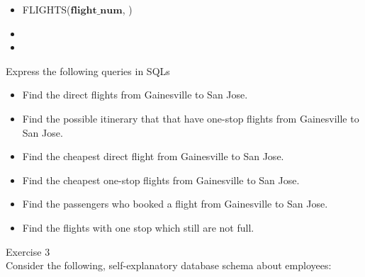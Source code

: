 \documentclass[12pt]{article}
\begin{document}
\begin{itemize}
\item 
FLIGHTS($\textbf{flight\_num}$, )
\item
{}
\item 
{}
\end{itemize}

Express the following queries in SQLs
\begin{itemize}
\item
Find the direct flights from Gainesville to San Jose.

\item 
Find the possible itinerary that that have one-stop flights from Gainesville to San Jose.

\item
Find the cheapest direct flight from Gainesville to San Jose.

\item 
Find the cheapest one-stop flights from Gainesville to San Jose.

\item
Find the passengers who booked a flight from Gainesville to San Jose.

\item
Find the flights with one stop which still are not full.

\end{itemize}

\newpage
Exercise 3\\
Consider the following, self-explanatory database schema about employees:
\end{document}
